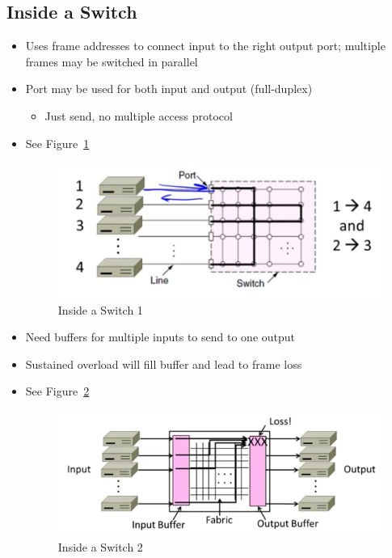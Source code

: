 \documentclass[12pt]{ctexart}   %
\begin{document}
	\subsection{Inside a Switch}
	\begin{itemize}
		\item Uses frame addresses to connect input to the right output port; multiple frames may be switched in parallel
		
		\item Port may be used for both input and output (full-duplex)
		\begin{itemize}
			\item Just send, no multiple access protocol
		\end{itemize}
		
		\item See Figure~\ref{fig:3-7-5}
		\begin{figure}[h!] %
		\centering
		 \includegraphics[scale=0.7]{images/3-7-5}
		\caption{ Inside a Switch  1 }
		 \label{fig:3-7-5}
		 \end{figure}
		 
		 \item Need buffers for multiple inputs to send to one output
		 \item Sustained overload will fill buffer and lead to frame loss
		 
		 \item See Figure~\ref{fig:3-7-6}
		\begin{figure}[h!] %
		\centering
		 \includegraphics[scale=0.7]{images/3-7-6}
		\caption{ Inside a Switch 2  }
		 \label{fig:3-7-6}
		 \end{figure}
	\end{itemize}
	
\end{document}
